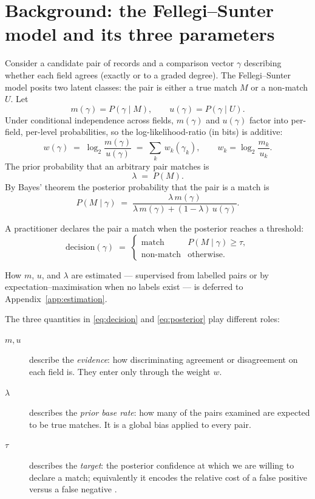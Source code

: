 \documentclass[conference]{IEEEtran}
\begin{document}
\section{Background: the Fellegi--Sunter model and its three parameters}
\label{sec:fs}
Consider a candidate pair of records and a comparison vector $\gamma$ describing whether
each field agrees (exactly or to a graded degree). The Fellegi--Sunter model
\cite{fellegi1969} posits two latent classes: the pair is either a true match $M$ or a
non-match $U$. Let
\begin{equation}
m(\gamma)=P(\gamma\mid M),\qquad u(\gamma)=P(\gamma\mid U).
\end{equation}
Under conditional independence across fields, $m(\gamma)$ and $u(\gamma)$ factor into
per-field, per-level probabilities, so the log-likelihood-ratio (in bits) is additive:
\begin{equation}
w(\gamma)\;=\;\log_2\frac{m(\gamma)}{u(\gamma)}\;=\;\sum_k\,w_k(\gamma_k),
\qquad w_k=\log_2\frac{m_k}{u_k}.
\end{equation}
The prior probability that an arbitrary pair matches is
\begin{equation}
\lambda\;=\;P(M).
\end{equation}
By Bayes' theorem the posterior probability that the pair is a match is
\begin{equation}
P(M\mid\gamma)\;=\;\frac{\lambda\,m(\gamma)}
{\lambda\,m(\gamma)+(1-\lambda)\,u(\gamma)}.
\label{eq:posterior}
\end{equation}

A practitioner declares the pair a match when the posterior reaches a threshold:
\begin{equation}
\text{decision}(\gamma)\;=\;\begin{cases}\text{match} & P(M\mid\gamma)\ge \tau,\\
\text{non-match} & \text{otherwise.}\end{cases}
\label{eq:decision}
\end{equation}

How $m$, $u$, and $\lambda$ are estimated --- supervised from labelled pairs or by
expectation--maximisation when no labels exist --- is deferred to Appendix~\ref{app:estimation}.

The three quantities in \eqref{eq:decision} and \eqref{eq:posterior} play different roles:
\begin{description}
\item[$m,u$] describe the \emph{evidence}: how discriminating agreement or disagreement on
each field is. They enter only through the weight $w$.
\item[$\lambda$] describes the \emph{prior base rate}: how many of the pairs examined are
expected to be true matches. It is a global bias applied to every pair.
\item[$\tau$] describes the \emph{target}: the posterior confidence at which we are willing
to declare a match; equivalently it encodes the relative cost of a false positive versus a
false negative \cite{winkler1993}.
\end{description}
\end{document}
